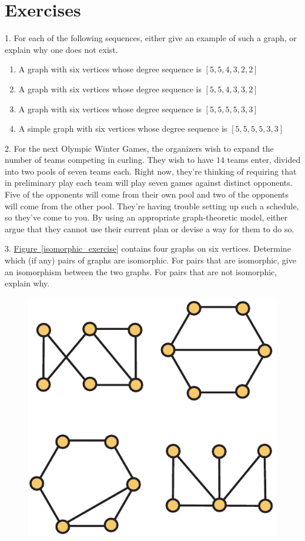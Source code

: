 \documentclass[10pt,]{book}
\theoremstyle{plain}
\theoremstyle{definition}
\theoremstyle{definition}
\theoremstyle{definition}
\theoremstyle{definition}
\numberwithin{equation}{section}
\begin{document}
\section[{Exercises}]{Exercises}\label{s_intro_exercises}
\begin{exerciselist}
\item[1.]\hypertarget{exercise-3}{}\hypertarget{p-74}{}%
For each of the following sequences, either give an example of such a graph, or explain why one does not exist.%
\leavevmode%
\begin{enumerate}[label=(\alph*)]
\item\hypertarget{li-20}{}\hypertarget{p-75}{}%
A graph with six vertices whose degree sequence is \([5,5,4,3,2,2]\)%
\item\hypertarget{li-21}{}\hypertarget{p-76}{}%
A graph with six vertices whose degree sequence is \([5,5,4,3,3,2]\)%
\item\hypertarget{li-22}{}\hypertarget{p-77}{}%
A graph with six vertices whose degree sequence is \([5,5,5,5,3,3]\)%
\item\hypertarget{li-23}{}\hypertarget{p-78}{}%
A simple graph with six vertices whose degree sequence is \([5,5,5,5,3,3]\)%
\end{enumerate}
\par\smallskip
\item[2.]\hypertarget{exercise-4}{}\hypertarget{p-79}{}%
For the next Olympic Winter Games, the organizers wish to expand the number of teams competing in curling. They wish to have \(14\) teams enter, divided into two pools of seven teams each. Right now, they're thinking of requiring that in preliminary play each team will play seven games against distinct opponents. Five of the opponents will come from their own pool and two of the opponents will come from the other pool. They're having trouble setting up such a schedule, so they've come to you. By using an appropriate graph-theoretic model, either argue that they cannot use their current plan or devise a way for them to do so.%
\par\smallskip
\item[3.]\hypertarget{exercise-5}{}\hypertarget{p-80}{}%
\hyperref[isomorphic_exercise]{Figure~\ref{isomorphic_exercise}} contains four graphs on six vertices. Determine which (if any) pairs of graphs are isomorphic. For pairs that are isomorphic, give an isomorphism between the two graphs. For pairs that are not isomorphic, explain why.%
\begin{figure}
\centering
\includegraphics[width=0.55\linewidth]{images/isomorphic_ex}

\end{figure}
\end{exerciselist}
\end{document}
